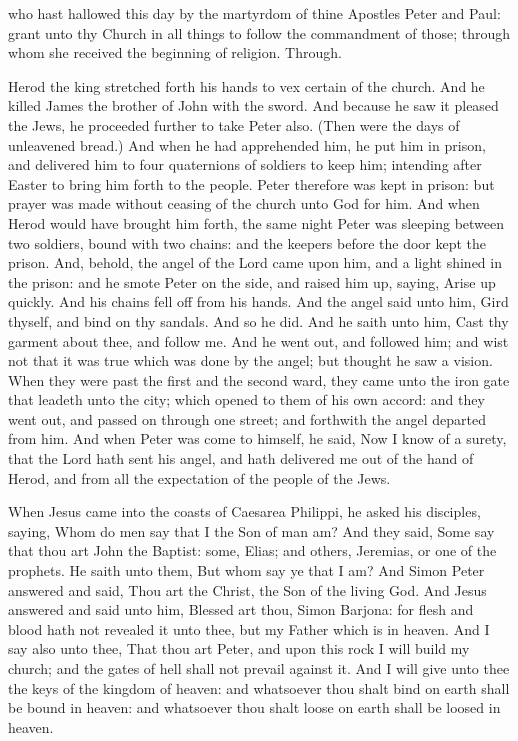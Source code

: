 \collect
{} who hast hallowed this day by the martyrdom of thine Apostles Peter and Paul: grant unto thy Church in all things to follow the commandment of those; through whom she received the beginning of religion. Through.

 Herod the king stretched forth his hands to vex certain of the church. And he killed James the brother of John with the sword. And because he saw it pleased the Jews, he proceeded further to take Peter also. (Then were the days of unleavened bread.) And when he had apprehended him, he put him in prison, and delivered him to four quaternions of soldiers to keep him; intending after Easter to bring him forth to the people. Peter therefore was kept in prison: but prayer was made without ceasing of the church unto God for him. And when Herod would have brought him forth, the same night Peter was sleeping between two soldiers, bound with two chains: and the keepers before the door kept the prison. And, behold, the angel of the Lord came upon him, and a light shined in the prison: and he smote Peter on the side, and raised him up, saying, Arise up quickly. And his chains fell off from his hands. And the angel said unto him, Gird thyself, and bind on thy sandals. And so he did. And he saith unto him, Cast thy garment about thee, and follow me. And he went out, and followed him; and wist not that it was true which was done by the angel; but thought he saw a vision. When they were past the first and the second ward, they came unto the iron gate that leadeth unto the city; which opened to them of his own accord: and they went out, and passed on through one street; and forthwith the angel departed from him. And when Peter was come to himself, he said, Now I know of a surety, that the Lord hath sent his angel, and hath delivered me out of the hand of Herod, and from all the expectation of the people of the Jews.


 When Jesus came into the coasts of Caesarea Philippi, he asked his disciples, saying, Whom do men say that I the Son of man am? And they said, Some say that thou art John the Baptist: some, Elias; and others, Jeremias, or one of the prophets. He saith unto them, But whom say ye that I am? And Simon Peter answered and said, Thou art the Christ, the Son of the living God. And Jesus answered and said unto him, Blessed art thou, Simon Barjona: for flesh and blood hath not revealed it unto thee, but my Father which is in heaven. And I say also unto thee, That thou art Peter, and upon this rock I will build my church; and the gates of hell shall not prevail against it. And I will give unto thee the keys of the kingdom of heaven: and whatsoever thou shalt bind on earth shall be bound in heaven: and whatsoever thou shalt loose on earth shall be loosed in heaven.

